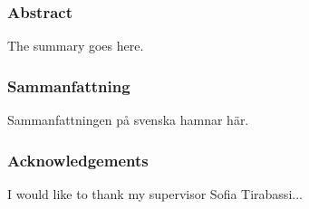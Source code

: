 \clearpage{\thispagestyle{empty}}
\begin{center}
	\subsubsection*{Abstract}
\end{center}
	
	The summary goes here. %
	
\begin{center}
	\item\subsubsection*{Sammanfattning}
\end{center}
	
	Sammanfattningen på svenska hamnar här. %

\begin{center}
	\item\subsubsection*{Acknowledgements}
\end{center}
	
	I would like to thank my supervisor Sofia Tirabassi...



